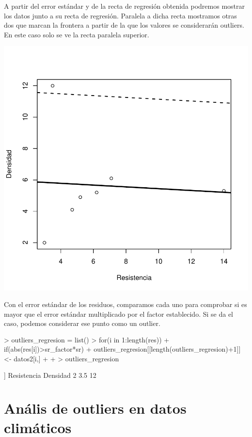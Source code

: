 \documentclass [a4paper] {article}
\begin{document}
A partir del error estándar y de la recta de regresión obtenida podremos mostrar los datos junto a su recta de regresión.
Paralela a dicha recta mostramos otras dos que marcan la frontera a partir de la que los valores se considerarán outliers.
En este caso solo se ve la recta paralela superior.
\begin{center}
\includegraphics{entrega-regresion_plot}
\end{center}

Con el error estándar de los residuos, comparamos cada uno para comprobar si es mayor que el error estándar multiplicado por el factor establecido.
Si se da el caso, podemos considerar ese punto como un outlier.
\begin{Schunk}
\begin{Sinput}
> outliers_regresion = list()
> for(i in 1:length(res)){
+   if(abs(res[i])>sr_factor*sr){
+     outliers_regresion[[length(outliers_regresion)+1]] <- datos2[i,]
+   }
+ }
> outliers_regresion
\end{Sinput}
\begin{Soutput}
[[1]]
  Resistencia Densidad
2         3.5       12
\end{Soutput}
\end{Schunk}

\newpage
\section{Anális de outliers en datos climáticos}
\end{document}
